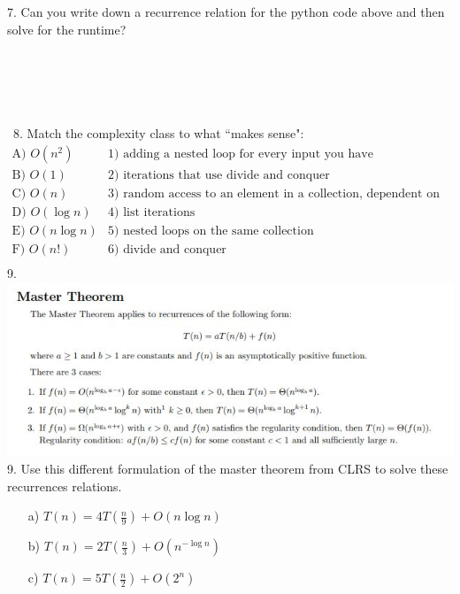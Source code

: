 \documentclass[12pt]{article}
\begin{document}
7. Can you write down a recurrence relation for the python code above and then solve for the runtime?\\\\\\\\\\\\\
8. Match the complexity class to what ``makes sense":
\[
\begin{array}{cc}
 \text{A) $O(n^2)$} & \text{1) adding a nested loop for every input you have} \\
 \text{B) $O(1)$} & \text{2) iterations that use divide and conquer} \\
 \text{C) $O(n)$} & \text{3) random access to an element in a collection, dependent on indexing} \\
 \text{D) $O(\log{n})$} & \text{4) list iterations} \\
 \text{E) $O(n\log{n})$} & \text{5) nested loops on the same collection} \\
 \text{F) $O(n!)$} & \text{6) divide and conquer} \\
\end{array}
\]
9. 
\newpage
\includegraphics[width=\linewidth]{mastertheorem.JPG}
9. Use this different formulation of the master theorem from CLRS to solve these recurrences relations.
\begin{enumerate}
    \item[a)]$T(n) = 4T(\frac{n}{9}) + O(n \log{n})$
    \item[b)]$T(n) = 2T(\frac{n}{3}) + O(n^{-\log{n}})$
    \item[c)]$T(n) = 5T(\frac{n}{2}) + O(2^n)$
\end{enumerate}
\end{document}
